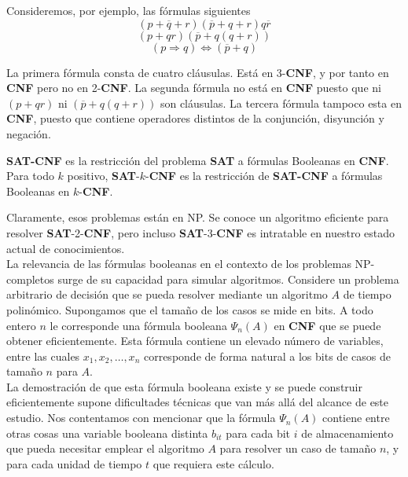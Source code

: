 Consideremos, por ejemplo, las fórmulas siguientes
\[ (p + \overline{q} + r)(\overline{p} + q + r)q\overline{r}\]
\[ (p + qr)(\overline{p} + q(q + r)) \]
\[ (p \Longrightarrow q) \iff (\overline{p} + q) \]

La primera fórmula consta de cuatro cláusulas. Está en 3-\textbf{CNF}, y por tanto en \textbf{CNF} pero no en 2-\textbf{CNF}. La segunda fórmula no está en \textbf{CNF} puesto que ni $(p + qr)$ ni $(\overline{p} + q(q + r))$ son cláusulas. La tercera fórmula tampoco esta en \textbf{CNF}, puesto que contiene operadores distintos de la conjunción, disyunción y negación.\\

\begin{fondo}
\textbf{SAT-CNF} es la restricción del problema \textbf{SAT} a fórmulas Booleanas en \textbf{CNF}. Para todo $k$ positivo, \textbf{SAT}-$k$-\textbf{CNF} es la restricción de \textbf{SAT-CNF} a fórmulas Booleanas en $k$-\textbf{CNF}.
\end{fondo}

Claramente, esos problemas están en NP. Se conoce un algoritmo eficiente para resolver \textbf{SAT}-2-\textbf{CNF}, pero incluso \textbf{SAT}-3-\textbf{CNF} es intratable en nuestro estado actual de conocimientos.\\

La relevancia de las fórmulas booleanas en el contexto de los problemas NP-completos surge de su capacidad para simular algoritmos. Considere un problema arbitrario de decisión que se pueda resolver mediante un algoritmo $A$ de tiempo polinómico. Supongamos que el tamaño de los casos se mide en bits. A todo entero $n$ le corresponde una fórmula booleana $\Psi_n (A)$ en \textbf{CNF} que se puede obtener eficientemente. Esta fórmula contiene un elevado número de variables, entre las cuales $x_1, x_2, \ldots, x_n$ corresponde de forma natural a los bits de casos de tamaño $n$ para $A$.\\

La demostración de que esta fórmula booleana existe y se puede construir eficientemente supone dificultades técnicas que van más allá del alcance de este estudio. Nos contentamos con mencionar que la fórmula $\Psi_n (A)$ contiene entre otras cosas una variable booleana distinta $b_{it}$ para cada bit $i$ de almacenamiento que pueda necesitar emplear el algoritmo $A$ para resolver un caso de tamaño $n$, y para cada unidad de tiempo $t$ que requiera este cálculo.\\

